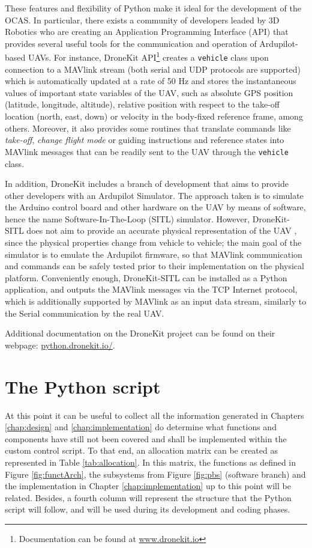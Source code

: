 These features and flexibility of Python make it ideal for the development of the OCAS.
In particular, there exists a community of developers leaded by 3D Robotics who are creating an Application Programming Interface (API) that provides several useful tools for the communication and operation of Ardupilot-based UAVs.
For instance, DroneKit API\footnote{Documentation can be found at \url{www.dronekit.io}} creates a \texttt{vehicle} class upon connection to a MAVlink stream (both serial and UDP protocols are supported) which is automatically updated at a rate of 50 Hz and stores the instantaneous values of important state variables of the UAV, such as absolute GPS position (latitude, longitude, altitude), relative position with respect to the take-off location (north, east, down) or velocity in the body-fixed reference frame, among others.
Moreover, it also provides some routines that translate commands like \emph{take-off}, \emph{change flight mode} or guiding instructions and reference states into MAVlink messages that can be readily sent to the UAV through the \texttt{vehicle} class.

In addition, DroneKit includes a branch of development that aims to provide other developers with an Ardupilot Simulator.
The approach taken is to simulate the Arduino control board and other hardware on the UAV by means of software, hence the name Software-In-The-Loop (SITL) simulator.
However, DroneKit-SITL does not aim to provide an accurate physical representation of the UAV \cite{vegaastorga2016}, since the physical properties change from vehicle to vehicle; the main goal of the simulator is to emulate the Ardupilot firmware, so that MAVlink communication and commands can be safely tested prior to their implementation on the physical platform.
Conveniently enough, DroneKit-SITL can be installed as a Python application, and outputs the MAVlink messages via the TCP Internet protocol, which is additionally supported by MAVlink as an input data stream, similarly to the Serial communication by the real UAV.

Additional documentation on the DroneKit project can be found on their webpage: \url{python.dronekit.io/}.


\section{The Python script}	\label{sec:script}

At this point it can be useful to collect all the information generated in Chapters \ref{chap:design} and \ref{chap:implementation} do determine what functions and components have still not been covered and shall be implemented within the custom control script.
To that end, an allocation matrix can be created as represented in Table \ref{tab:allocation}.
In this matrix, the functions as defined in Figure \ref{fig:functArch}, the subsystems from Figure \ref{fig:pbs} (software branch) and the implementation in Chapter \ref{chap:implementation} up to this point will be related.
Besides, a fourth column will represent the structure that the Python script will follow, and will be used during its development and coding phases.

